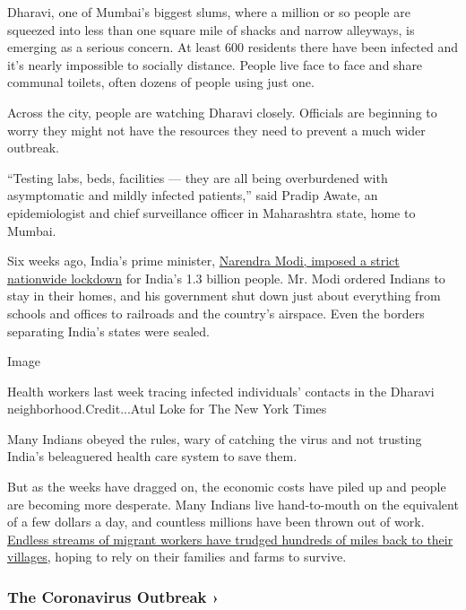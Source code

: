 Dharavi, one of Mumbai's biggest slums, where a million or so people are
squeezed into less than one square mile of shacks and narrow alleyways,
is emerging as a serious concern. At least 600 residents there have been
infected and it's nearly impossible to socially distance. People live
face to face and share communal toilets, often dozens of people using
just one.

Across the city, people are watching Dharavi closely. Officials are
beginning to worry they might not have the resources they need to
prevent a much wider outbreak.

``Testing labs, beds, facilities --- they are all being overburdened
with asymptomatic and mildly infected patients,'' said Pradip Awate, an
epidemiologist and chief surveillance officer in Maharashtra state, home
to Mumbai.

Six weeks ago, India's prime minister,
\href{https://www.nytimes.com/2020/03/24/world/asia/india-coronavirus-lockdown.html}{Narendra
Modi, imposed a strict nationwide lockdown} for India's 1.3 billion
people. Mr. Modi ordered Indians to stay in their homes, and his
government shut down just about everything from schools and offices to
railroads and the country's airspace. Even the borders separating
India's states were sealed.

Image

Health workers last week tracing infected individuals' contacts in the
Dharavi neighborhood.Credit...Atul Loke for The New York Times

Many Indians obeyed the rules, wary of catching the virus and not
trusting India's beleaguered health care system to save them.

But as the weeks have dragged on, the economic costs have piled up and
people are becoming more desperate. Many Indians live hand-to-mouth on
the equivalent of a few dollars a day, and countless millions have been
thrown out of work.
\href{https://www.nytimes.com/2020/03/29/world/asia/coronavirus-india-migrants.html}{Endless
streams of migrant workers have trudged hundreds of miles back to their
villages}, hoping to rely on their families and farms to survive.

\href{https://www.nytimes.com/news-event/coronavirus?action=click\&pgtype=Article\&state=default\&region=MAIN_CONTENT_3\&context=storylines_faq}{}

\hypertarget{the-coronavirus-outbreak-}{%
\subsubsection{The Coronavirus Outbreak
›}\label{the-coronavirus-outbreak-}}

